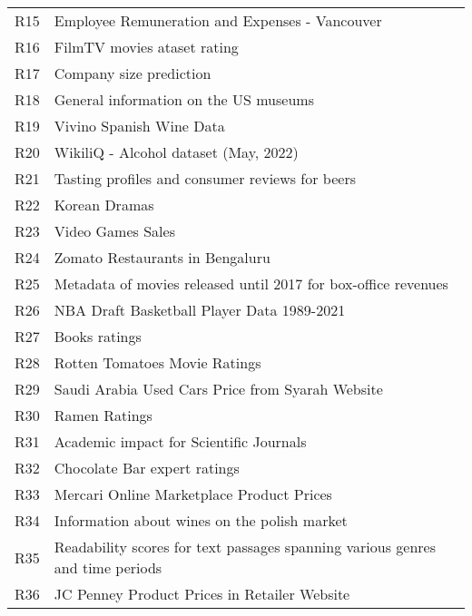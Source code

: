 \begin{table}
\begin{tabular}{ll}
R15 & Employee Remuneration and Expenses - Vancouver \\
R16 & FilmTV movies ataset rating \\
R17 & Company size prediction \\
R18 & General information on the US museums \\
R19 & Vivino Spanish Wine Data \\
R20 & WikiliQ - Alcohol dataset (May, 2022) \\
R21 & Tasting profiles and consumer reviews for beers \\
R22 & Korean Dramas \\
R23 & Video Games Sales \\
R24 & Zomato Restaurants in Bengaluru \\
R25 & Metadata of movies released until 2017 for box-office revenues \\
R26 & NBA Draft Basketball Player Data 1989-2021 \\
R27 & Books ratings \\
R28 & Rotten Tomatoes Movie Ratings \\
R29 & Saudi Arabia Used Cars Price from Syarah Website \\
R30 & Ramen Ratings \\
R31 & Academic impact for Scientific Journals \\
R32 & Chocolate Bar expert ratings \\
R33 & Mercari Online Marketplace Product Prices \\
R34 & Information about wines on the polish market \\
R35 & Readability scores for text passages spanning various genres and time periods \\
R36 & JC Penney Product Prices in Retailer Website \\
\bottomrule
\end{tabular}
\end{table}

